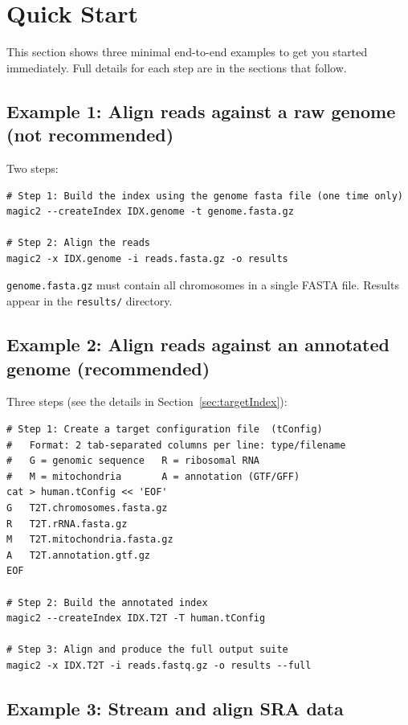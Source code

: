 \documentclass[11pt]{article}
\newcommand{\code}[1]{\texttt{#1}}
\begin{document}
\section{Quick Start}

This section shows three minimal end-to-end examples to get you started
immediately.  Full details for each step are in the sections that follow.

\subsection{Example 1: Align reads against a raw genome (not recommended)}

Two steps:

\begin{lstlisting}
# Step 1: Build the index using the genome fasta file (one time only)
magic2 --createIndex IDX.genome -t genome.fasta.gz

# Step 2: Align the reads
magic2 -x IDX.genome -i reads.fasta.gz -o results
\end{lstlisting}

\code{genome.fasta.gz} must contain all chromosomes in a single FASTA
file.  Results appear in the \code{results/} directory.

\subsection{Example 2: Align reads against an annotated genome (recommended)}

Three steps (see the details in Section~\ref{sec:targetIndex}):

\begin{lstlisting}
# Step 1: Create a target configuration file  (tConfig)
#   Format: 2 tab-separated columns per line: type/filename
#   G = genomic sequence   R = ribosomal RNA
#   M = mitochondria       A = annotation (GTF/GFF)
cat > human.tConfig << 'EOF'
G	T2T.chromosomes.fasta.gz
R	T2T.rRNA.fasta.gz
M	T2T.mitochondria.fasta.gz
A	T2T.annotation.gtf.gz
EOF

# Step 2: Build the annotated index
magic2 --createIndex IDX.T2T -T human.tConfig

# Step 3: Align and produce the full output suite
magic2 -x IDX.T2T -i reads.fastq.gz -o results --full
\end{lstlisting}

\subsection{Example 3: Stream and align SRA data}
\end{document}
